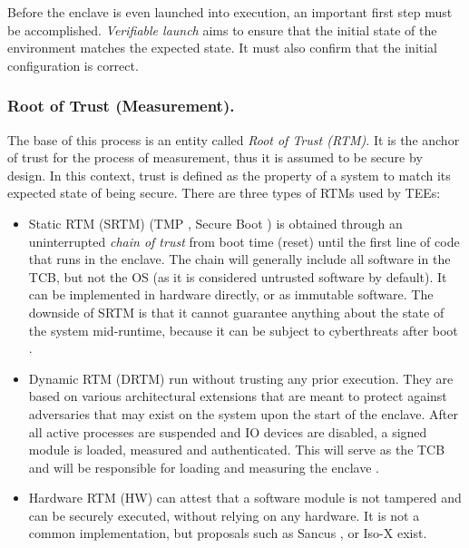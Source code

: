 \documentclass[runningheads,a4paper]{uwsese}
\begin{document}
Before the enclave is even launched into execution, an important first step
must be accomplished. \emph{Verifiable launch} aims to ensure that the initial
state of the environment matches the expected state. It must also confirm that
the initial configuration is correct. 

\subsubsection{Root of Trust (Measurement).}
\label{rot}

The base of this process is an entity called \emph{Root of Trust (RTM)}. It is
the anchor of trust for the process of measurement, thus it is assumed to be
secure by design. In this context, trust is defined as the property of a system
to match its expected state of being secure. There are three types of RTMs used
by TEEs:

\begin{itemize}
    \item Static RTM (SRTM) (TMP \cite{tee_tcg_arch_overview},
        Secure Boot \cite{windows-driver-content2023Dec}) is obtained
        through an uninterrupted \emph{chain of trust} from boot time
        (reset) until the first line of code that runs in the enclave. The
        chain will generally include all software in the TCB, but not the
        OS (as it is considered untrusted software by default). It can be
        implemented in hardware directly, or as immutable software. The
        downside of SRTM is that it cannot guarantee anything about the
        state of the system mid-runtime, because it can be subject to
        cyberthreats after boot \cite{tee_smart_rot} \cite{tee_hw_sup}.
    \item Dynamic RTM (DRTM) run without trusting any prior execution. They are
        based on various architectural extensions that are meant to protect
        against adversaries that may exist on the system upon the start of the
        enclave. After all active processes are suspended and IO devices are
        disabled, a signed module is loaded, measured and authenticated. This
        will serve as the TCB and will be responsible for loading and measuring
        the enclave \cite{tee_hw_sup}.
    \item Hardware RTM (HW) can attest that a software module is not tampered
        and can be securely executed, without relying on any hardware. It is
        not a common implementation, but proposals such as Sancus
        \cite{tee_sancus}, or Iso-X \cite{tee_isox} exist. 
\end{itemize}
\end{document}
